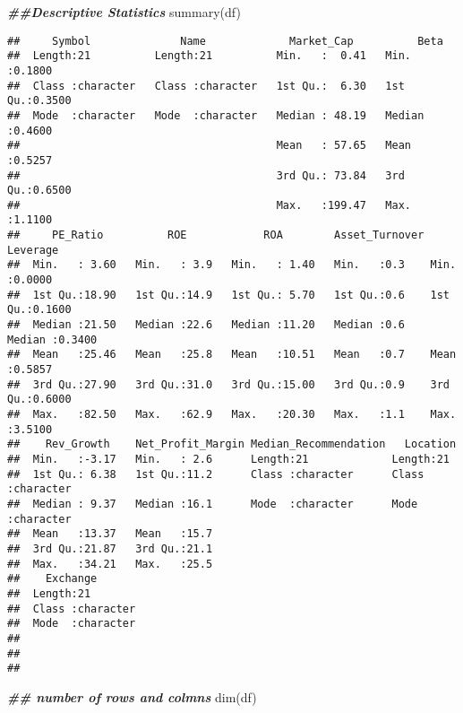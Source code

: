\documentclass[
]{article}
\newenvironment{Shaded}{\begin{snugshade}}{\end{snugshade}}
\newcommand{\DocumentationTok}[1]{\textcolor[rgb]{0.56,0.35,0.01}{\textbf{\textit{#1}}}}
\newcommand{\FunctionTok}[1]{\textcolor[rgb]{0.00,0.00,0.00}{#1}}
\newcommand{\NormalTok}[1]{#1}
\begin{document}
\begin{Shaded}
\begin{Highlighting}[]
\DocumentationTok{\#\#Descriptive Statistics}
\FunctionTok{summary}\NormalTok{(df)}
\end{Highlighting}
\end{Shaded}

\begin{verbatim}
##     Symbol              Name             Market_Cap          Beta       
##  Length:21          Length:21          Min.   :  0.41   Min.   :0.1800  
##  Class :character   Class :character   1st Qu.:  6.30   1st Qu.:0.3500  
##  Mode  :character   Mode  :character   Median : 48.19   Median :0.4600  
##                                        Mean   : 57.65   Mean   :0.5257  
##                                        3rd Qu.: 73.84   3rd Qu.:0.6500  
##                                        Max.   :199.47   Max.   :1.1100  
##     PE_Ratio          ROE            ROA        Asset_Turnover    Leverage     
##  Min.   : 3.60   Min.   : 3.9   Min.   : 1.40   Min.   :0.3    Min.   :0.0000  
##  1st Qu.:18.90   1st Qu.:14.9   1st Qu.: 5.70   1st Qu.:0.6    1st Qu.:0.1600  
##  Median :21.50   Median :22.6   Median :11.20   Median :0.6    Median :0.3400  
##  Mean   :25.46   Mean   :25.8   Mean   :10.51   Mean   :0.7    Mean   :0.5857  
##  3rd Qu.:27.90   3rd Qu.:31.0   3rd Qu.:15.00   3rd Qu.:0.9    3rd Qu.:0.6000  
##  Max.   :82.50   Max.   :62.9   Max.   :20.30   Max.   :1.1    Max.   :3.5100  
##    Rev_Growth    Net_Profit_Margin Median_Recommendation   Location        
##  Min.   :-3.17   Min.   : 2.6      Length:21             Length:21         
##  1st Qu.: 6.38   1st Qu.:11.2      Class :character      Class :character  
##  Median : 9.37   Median :16.1      Mode  :character      Mode  :character  
##  Mean   :13.37   Mean   :15.7                                              
##  3rd Qu.:21.87   3rd Qu.:21.1                                              
##  Max.   :34.21   Max.   :25.5                                              
##    Exchange        
##  Length:21         
##  Class :character  
##  Mode  :character  
##                    
##                    
## 
\end{verbatim}

\begin{Shaded}
\begin{Highlighting}[]
\DocumentationTok{\#\# number of rows and colmns }
\FunctionTok{dim}\NormalTok{(df)}
\end{Highlighting}
\end{Shaded}
\end{document}
